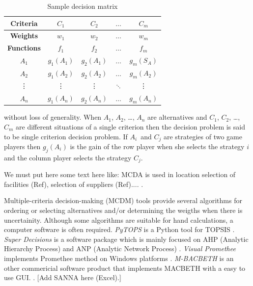 \documentclass[authoryear,preprint,review,12pt]{elsarticle}
\begin{document}
\begin{table}[H]
	\centering
	\begin{tabular}{|c|c|c|c|c|}
		\hline
		\textbf{Criteria} & {$C_1$} & {$C_2$} & $\dots$ & {$C_m$} \\
		\hline
		\textbf{Weights} & {$w_1$} & {$w_2$} & $\dots$ & {$w_m$} \\
		\hline
		\textbf{Functions} & {$f_1$} & {$f_2$} & $\dots$ & {$f_m$} \\
		\hline
		\hline
		{$A_1$} & {$g_1(A_1)$} & {$g_2(A_1)$} & $\dots$ & {$g_m(S_A)$} \\
		\hline
		{$A_2$} & {$g_1(A_2)$} & {$g_2(A_2)$} & $\dots$ & {$g_m(A_2)$} \\
		\hline
		\vdots & \vdots & \vdots & $\ddots$ & \vdots  \\
		\hline		
		$A_n$ & $g_1(A_n) $ &  $g_2(A_n) $ & $\dots$ &  $g_m(A_n) $ \\
		\hline   
	\end{tabular}
	\caption{Sample decision matrix}
	\label{table:sample_decision_matrix} 
\end{table}

\noindent without loss of generality. When $A_1$, $A_2$, \dots, $A_n$ are alternatives and $C_1$, $C_2$, \dots, $C_m$ are different situations of a single criterion then the decision problem is said to be single criterion decision problem. If $A_i$ and $C_j$ are strategies of two game players then $g_j(A_i)$ is the gain of the row player when she selects the strategy $i$ and the column player selects the strategy $C_j$. 

{\color{red}We must put here some text here like:
MCDA is used in location selection of facilities (Ref), selection of suppliers (Ref)....
.}

Multiple-criteria decision-making (MCDM) tools provide several algorithms for ordering or  selecting alternatives and/or determining the weigths when there is uncertainity. Although some algorithms are suitable for hand calculations, a computer software is often required. \emph{PyTOPS} is a Python tool for TOPSIS \cite{Yadav_2019}. \emph{Super Decisions} is a software package which is mainly focused on AHP (Analytic Hierarchy Process) and ANP (Analytic Network Process) \cite{adams2003super}. \emph{Visual Promethee} implements Promethee method on Windows platforms \cite{Mareschal_2009}. \emph{M-BACBETH} is an other commericial software product that implements MACBETH with a easy to use GUI.  \cite{macbeth}. {\color{red} [Add SANNA here (Excel).]}
\end{document}
